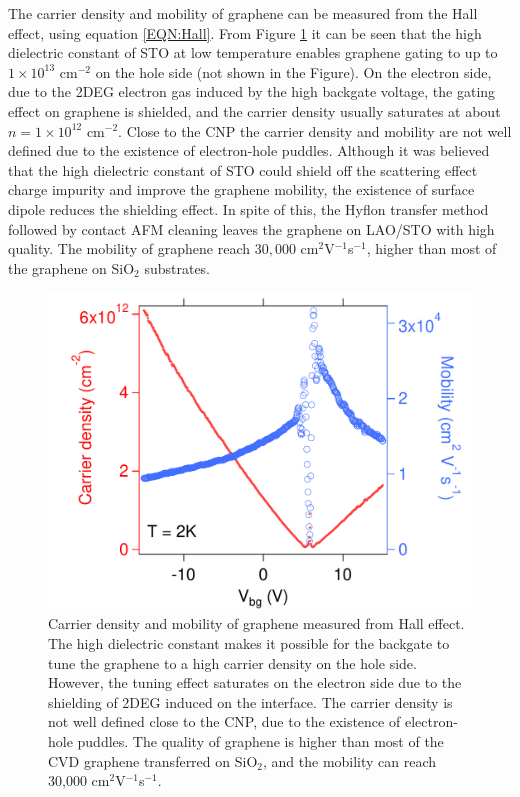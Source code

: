 \documentclass[pdflatex, sectionletters, 12pt]{pittetd}    %
\begin{document}
The carrier density and mobility of graphene can be measured from the Hall effect, using equation \ref{EQN:Hall}. From Figure \ref{FIG:CarrierDensityMobility} it can be seen that the high dielectric constant of STO at low temperature enables graphene gating to up to $1 \times 10^{13}$ $\mathrm{cm}^{-2}$ on the hole side (not shown in the Figure). On the electron side, due to the 2DEG electron gas induced by the high backgate voltage, the gating effect on graphene is shielded, and the carrier density usually saturates at about $n = 1 \times 10^{12}$ $\mathrm{cm}^{-2}$. Close to the CNP the carrier density and mobility are not well defined due to the existence of electron-hole puddles. Although it was believed that the high dielectric constant of STO could shield off the scattering effect charge impurity and improve the graphene mobility, the existence of surface dipole reduces the shielding effect\cite{sachs2014ferroelectric}. In spite of this, the Hyflon transfer method followed by contact AFM cleaning leaves the graphene on LAO/STO with high quality. The mobility of graphene reach $30,000$ cm$^{2}$V$^{-1}$s$^{-1}$, higher than most of the graphene on SiO$_2$ substrates. 
\\

\begin{figure}[h!]
	\centering
	\includegraphics[width=.55\textwidth]{Drawing/CarrierDensityMobility.pdf}
	\caption{Carrier density and mobility of graphene measured from Hall effect. The high dielectric constant makes it possible for the backgate to tune the graphene to a high carrier density on the hole side. However, the tuning effect saturates on the electron side due to the shielding of 2DEG induced on the interface. The carrier density is not well defined close to the CNP, due to the existence of electron-hole puddles. The quality of graphene is higher than most of the CVD graphene transferred on SiO$_2$, and the mobility can reach 30,000 cm$^2$V$^{-1}$s$^{-1}$.}
	\label{FIG:CarrierDensityMobility}
\end{figure}
\end{document}
